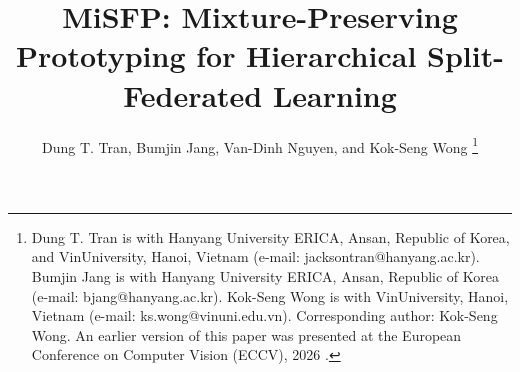 \documentclass[journal,10pt]{IEEEtai}
\title{MiSFP: Mixture-Preserving Prototyping for Hierarchical Split-Federated Learning}
\author{Dung T. Tran, Bumjin Jang, Van-Dinh Nguyen, and Kok-Seng Wong%
\thanks{Dung T. Tran is with Hanyang University ERICA, Ansan, Republic of Korea, and VinUniversity, Hanoi, Vietnam (e-mail: jacksontran@hanyang.ac.kr). Bumjin Jang is with Hanyang University ERICA, Ansan, Republic of Korea (e-mail: bjang@hanyang.ac.kr). Kok-Seng Wong is with VinUniversity, Hanoi, Vietnam (e-mail: ks.wong@vinuni.edu.vn). Corresponding author: Kok-Seng Wong. An earlier version of this paper was presented at the European Conference on Computer Vision (ECCV), 2026 \cite{tran2026h}.}
}
\begin{document}
\maketitle









\appendices
% 


\end{document}
